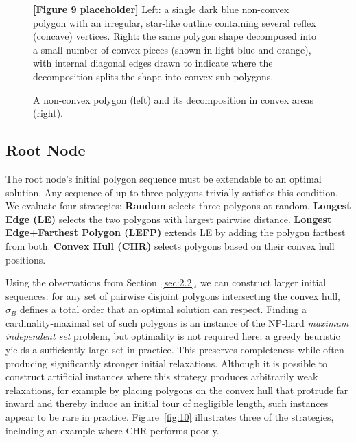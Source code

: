 \documentclass[11pt,a4paper]{article}
\theoremstyle{plain}
\begin{document}
\begin{figure}[h]
\centering
\begin{figplaceholder}
\textbf{[Figure 9 placeholder]} Left: a single dark blue non-convex polygon with an irregular, star-like outline containing several reflex (concave) vertices. Right: the same polygon shape decomposed into a small number of convex pieces (shown in light blue and orange), with internal diagonal edges drawn to indicate where the decomposition splits the shape into convex sub-polygons.
\end{figplaceholder}
\caption{A non-convex polygon (left) and its decomposition in convex areas (right).}
\label{fig:9}
\end{figure}

\subsection{Root Node}
\label{sec:3.2}

The root node's initial polygon sequence must be extendable to an optimal solution. Any sequence of up to three polygons trivially satisfies this condition. We evaluate four strategies: \textbf{Random} selects three polygons at random. \textbf{Longest Edge (LE)} selects the two polygons with largest pairwise distance. \textbf{Longest Edge+Farthest Polygon (LEFP)} extends LE by adding the polygon farthest from both. \textbf{Convex Hull (CHR)} selects polygons based on their convex hull positions.

Using the observations from Section~\ref{sec:2.2}, we can construct larger initial sequences: for any set of pairwise disjoint polygons intersecting the convex hull, $\sigma_B$ defines a total order that an optimal solution can respect. Finding a cardinality-maximal set of such polygons is an instance of the NP-hard \emph{maximum independent set} problem, but optimality is not required here; a greedy heuristic yields a sufficiently large set in practice. This preserves completeness while often producing significantly stronger initial relaxations. Although it is possible to construct artificial instances where this strategy produces arbitrarily weak relaxations, for example by placing polygons on the convex hull that protrude far inward and thereby induce an initial tour of negligible length, such instances appear to be rare in practice. Figure~\ref{fig:10} illustrates three of the strategies, including an example where CHR performs poorly.
\end{document}
